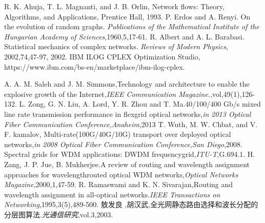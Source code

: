\documentclass[master]{thesis-uestc}
\begin{document}
\begin{thebibliography}{1}
R. K. Ahuja, T. L. Magnanti, and J. B. Orlin, Network flows: Theory, Algorithms, and Applications, Prentice Hall, 1993.
P. Erdos and A. Renyi. On the evolution of random graphs. \emph{Publications of the Mathematical Institute of the Hungarian Academy of
Sciences},1960,5,17-61.
R. Albert and A. L. Barabasi. Statistical mechanics of complex networks. \emph{Reviews of Modern Physics}, 2002,74,47-97, 2002.
IBM ILOG CPLEX Optimization Studio, https://www.ibm.com/bs-en/marketplace/ibm-ilog-cplex.

A. A. M. Saleh and J. M. Simmons,Technology and architecture to enable the explosive growth of the Internet,\emph{IEEE Communication Magazine.},vol,49(1),126-132.
L. Zong, G. N. Liu, A. Lord, Y. R. Zhou and T. Ma.40/100/400 Gb/s mixed line rate transmission performance in flexgrid optical networks,\emph{in 2013 Optical Fiber Communication Conference,Anaheim},2013
T. Wuth, M. W. Chbat, and V. F. kamalov, Multi-rate(100G/40G/10G) transport over deployed optical networks,\emph{in 2008 Optical Fiber Communication Conference,San Diego},2008.
Spectral grids for WDM applications: DWDM frequencygrid,\emph{ITU-T},G.694.1.
H. Zang, J. P. Jue, B. Mukherjee.A review of routing and wavelength assignment approaches for wavelengthrouted optical WDM networks,\emph{Optical Networks Magazine},2000,1,47-59.
R. Ramaswami and K. N. Sivarajan,Routing and wavelength assignment in all-optical networks.\emph{IEEE Transactions on Networking},1995,3(5),489-500.
敖发良 ,胡汉武,全光网静态路由选择和波长分配的分层图算法.\emph{光通信研究},vol.3,2003.
\end{thebibliography}
\end{document}

